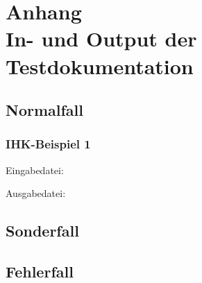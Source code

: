 \addtocounter{chapter}{1}
\chapter*{Anhang \thechapter\\[1.2cm] In- und Output der Testdokumentation}
\label{InOutput}
\section*{Normalfall}
\subsection{IHK-Beispiel 1}
Eingabedatei:
%

Ausgabedatei:
%
\clearpage
\section*{Sonderfall}

\clearpage
\section*{Fehlerfall}

\cleardoublepage